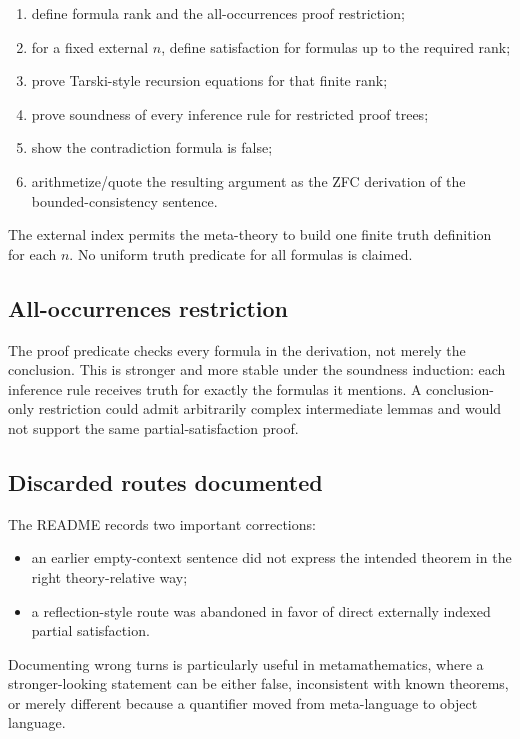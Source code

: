 \documentclass[
  10pt,
  a4paper,
  twoside,
  open=any,
  parskip=half,
  headings=big
]{scrreprt}
\begin{document}
\begin{enumerate}
  \item define formula rank and the all-occurrences proof restriction;
  \item for a fixed external \(n\), define satisfaction for formulas up to the
        required rank;
  \item prove Tarski-style recursion equations for that finite rank;
  \item prove soundness of every inference rule for restricted proof trees;
  \item show the contradiction formula is false;
  \item arithmetize/quote the resulting argument as the ZFC derivation of the
        bounded-consistency sentence.
\end{enumerate}

The external index permits the meta-theory to build one finite truth
definition for each \(n\).  No uniform truth predicate for all formulas is
claimed.

\subsection{All-occurrences restriction}

The proof predicate checks every formula in the derivation, not merely the
conclusion.  This is stronger and more stable under the soundness induction:
each inference rule receives truth for exactly the formulas it mentions.
A conclusion-only restriction could admit arbitrarily complex intermediate
lemmas and would not support the same partial-satisfaction proof.

\subsection{Discarded routes documented}

The README records two important corrections:

\begin{itemize}
  \item an earlier empty-context sentence did not express the intended theorem
        in the right theory-relative way;
  \item a reflection-style route was abandoned in favor of direct externally
        indexed partial satisfaction.
\end{itemize}

Documenting wrong turns is particularly useful in metamathematics, where a
stronger-looking statement can be either false, inconsistent with known
theorems, or merely different because a quantifier moved from meta-language to
object language.
\end{document}
